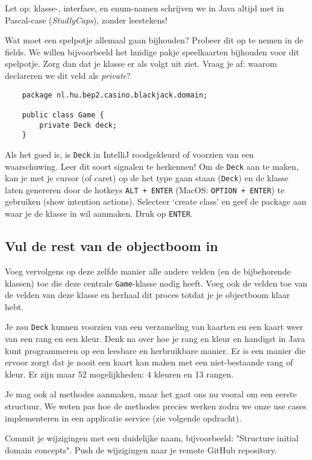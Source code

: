 \documentclass[dutch,a4paper,12pt,doubleside]{book}
\begin{document}
Let op: klasse-, interface, en enum-namen schrijven we in Java altijd met in Pascal-case 
(\textit{StudlyCaps}), zonder leestekens!

Wat moet een spelpotje allemaal gaan bijhouden? Probeer dit op te nemen in de fields.
We willen bijvoorbeeld het huidige pakje speelkaarten bijhouden voor dit spelpotje.
Zorg dan dat je klasse er als volgt uit ziet. Vraag je af: waarom declareren we dit veld als \textit{private}?

\begin{verbatim}
    package nl.hu.bep2.casino.blackjack.domain;

    public class Game {
        private Deck deck;
    }
\end{verbatim}

Als het goed is, is \texttt{Deck} in IntelliJ roodgekleurd 
of voorzien van een waarschuwing. Leer dit soort signalen te herkennen!
Om de \texttt{Deck} aan te maken, kan je met je cursor (of caret) op de het
type gaan staan (\texttt{Deck}) en de klasse laten genereren door de hotkeys
\texttt{ALT + ENTER} (MacOS: \texttt{OPTION + ENTER}) te gebruiken 
(show intention actions). Selecteer `create class' en geef de package aan 
waar je de klasse in wil aanmaken. Druk op \texttt{ENTER}.

\subsection{Vul de rest van de objectboom in}
Voeg vervolgens op deze zelfde manier alle andere velden (en de bijbehorende klassen) toe 
die deze centrale \texttt{Game}-klasse nodig heeft.
Voeg ook de velden toe van de velden van deze klasse en herhaal dit proces totdat
je je objectboom klaar hebt.

Je zou \texttt{Deck} kunnen voorzien van een verzameling van kaarten 
en een kaart weer van een rang en een kleur. Denk na over hoe je rang en kleur en 
handigst in Java kunt programmeren op een leesbare en herbruikbare manier.
Er is een manier die ervoor zorgt dat je nooit een kaart kan maken met een niet-bestaande 
rang of kleur. Er zijn maar 52 mogelijkheden: 4 kleuren en 13 rangen.

Je mag ook al methodes aanmaken, maar het gaat ons nu vooral om een eerste structuur.
We weten pas hoe de methodes precies werken zodra we onze use cases implementeren 
in een applicatie service (zie volgende opdracht).

Commit je wijzigingen met een duidelijke naam, 
bijvoorbeeld: "Structure initial domain concepts". 
Push de wijzigingen naar je remote GitHub repository.
\end{document}
